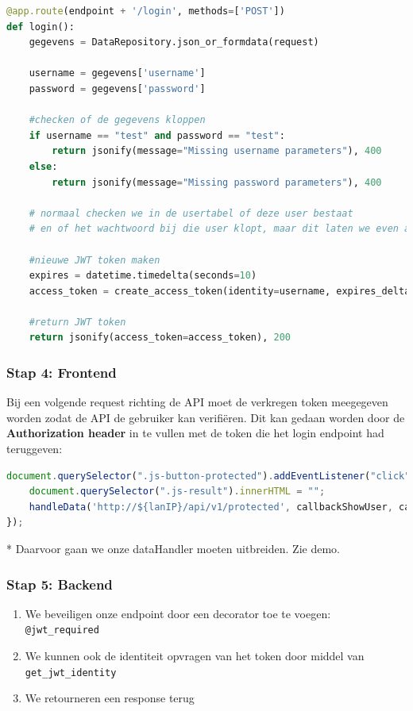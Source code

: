 \documentclass{article}
\newcommand{\bold}[1]{\textbf{#1}}
\begin{document}
\begin{lstlisting}[language=Python]
@app.route(endpoint + '/login', methods=['POST'])
def login():
    gegevens = DataRepository.json_or_formdata(request)

    username = gegevens['username']
    password = gegevens['password']

    #checken of de gegevens kloppen
    if username == "test" and password == "test":
        return jsonify(message="Missing username parameters"), 400
    else:
        return jsonify(message="Missing password parameters"), 400

    # normaal checken we in de usertabel of deze user bestaat 
    # en of het wachtwoord bij die user klopt, maar dit laten we even achterwege
    
    #nieuwe JWT token maken
    expires = datetime.timedelta(seconds=10)
    access_token = create_access_token(identity=username, expires_delta=expires)

    #return JWT token
    return jsonify(access_token=access_token), 200
\end{lstlisting}

\subsubsection{Stap 4: Frontend}
Bij een volgende request richting de API moet de verkregen token meegegeven
worden zodat de API de gebruiker kan verifiëren. Dit kan gedaan worden door
de \bold{Authorization header} in te vullen met de token die het login endpoint had
teruggeven:

\begin{lstlisting}[language=JavaScript]
document.querySelector(".js-button-protected").addEventListener("click", () => {
    document.querySelector(".js-result").innerHTML = "";
    handleData('http://${lanIP}/api/v1/protected', callbackShowUser, callbackShowError, "GET", null, token); //token = Authorization header
});
\end{lstlisting}

* Daarvoor gaan we onze dataHandler moeten uitbreiden. Zie demo.

\subsubsection{Stap 5: Backend}
\begin{enumerate}
    \item We beveiligen onze endpoint door een decorator toe te voegen: \lstinline{@jwt_required}
    \item We kunnen ook de identiteit opvragen van het token door middel van \lstinline{get_jwt_identity}
    \item We retourneren een response terug
\end{enumerate}
\end{document}

